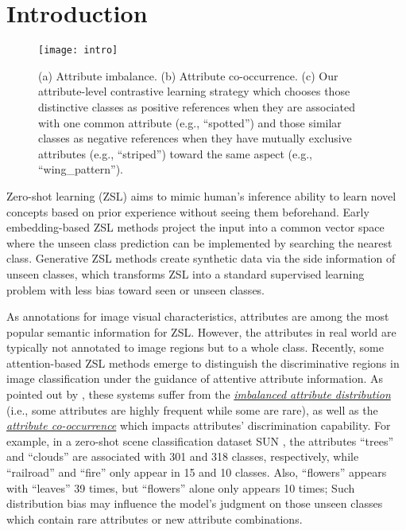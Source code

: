 \documentclass[letterpaper]{article} \usepackage{aaai23}  \usepackage{times}  \usepackage{helvet}  \usepackage{courier}  \usepackage[hyphens]{url}  \usepackage{graphicx} \urlstyle{rm} \def\UrlFont{\rm}  \usepackage{natbib}  \usepackage{caption} \frenchspacing  \setlength{\pdfpagewidth}{8.5in}  \setlength{\pdfpageheight}{11in}  \usepackage{algorithm}
\newcommand{\fy}[1]{{\color{black}#1}}
\begin{document}
\section{Introduction}
\begin{figure}[t]
  \centering
  \vspace{-1pt}
  \texttt{[image: intro]}
  \caption{ 
    (a) Attribute imbalance. 
  {(b) Attribute co-occurrence.} 
  (c) {Our attribute-level contrastive learning strategy 
  which 
  chooses those distinctive classes as positive references when they are associated with one common attribute (e.g., ``spotted'')} and those similar classes as negative references 
  when they have mutually exclusive attributes (e.g., ``striped'')  toward the same aspect (e.g., ``wing_pattern'').
  }
  \label{fig:case}
  \vspace{-5pt}
\end{figure}
Zero-shot learning (ZSL) aims to mimic human's inference ability to learn novel concepts based on prior experience without seeing them \fy{beforehand}.
Early embedding-based ZSL  methods  
project the input into a common vector space where  the unseen class prediction can be implemented by searching the nearest class. Generative ZSL methods create synthetic data {via the} 
side information of unseen classes, which {transforms} ZSL into a standard supervised learning problem with less bias toward seen or unseen classes.

As annotations for image visual characteristics, attributes are among  the most popular semantic information for ZSL.
However, the attributes in real world are typically  not annotated to image regions but to a whole class. 
Recently, some attention-based ZSL methods \cite{Chen2022MSDN,Chen2021TransZero} emerge to {distinguish the discriminative regions in image classification} under the guidance of attentive attribute information.
As pointed out by \cite{DBLP:conf/cvpr/WangHLXY021}, these systems  suffer from the {\ul{\emph{imbalanced attribute distribution}}} (i.e., some attributes are highly frequent while some are rare), as well as the {\ul{\emph{attribute co-occurrence}}} which impacts attributes' discrimination capability.
{For example, in a zero-shot scene classification dataset SUN \cite{DBLP:conf/cvpr/PattersonH12}, the attributes ``trees'' and ``clouds'' are associated with 301 and 318 classes, respectively, while    ``railroad'' and ``fire'' only appear in 15 and 10 classes.}
Also, 
``flowers'' appears with ``leaves'' 39 times, but ``flowers'' alone only appears 10 times; 
Such distribution bias may influence the model's judgment on those unseen classes which contain {rare attributes or new attribute combinations}.
\end{document}
